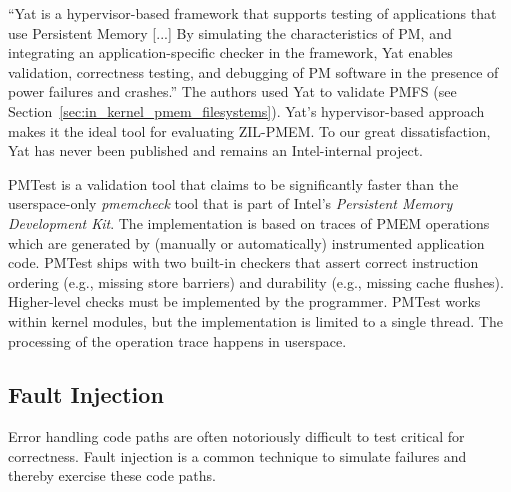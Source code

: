 \documentclass[12pt,a4paper,twoside]{book}
\begin{document}
“Yat is a hypervisor-based framework that supports testing of applications that use Persistent Memory [...]
By simulating the characteristics of PM, and integrating an application-specific checker in the framework, Yat enables validation, correctness testing, and debugging of PM software in the presence of power failures and crashes.”
The authors used Yat to validate PMFS (see Section~\ref{sec:in_kernel_pmem_filesystems}).
Yat's hypervisor-based approach makes it the ideal tool for evaluating ZIL-PMEM.
To our great dissatisfaction, Yat has never been published and remains an Intel-internal project.

PMTest is a validation tool that claims to be significantly faster than the userspace-only \textit{pmemcheck} tool that is part of Intel's \textit{Persistent Memory Development Kit}.
The implementation is based on traces of PMEM operations which are generated by (manually or automatically) instrumented application code.
PMTest ships with two built-in checkers that assert correct instruction ordering (e.g., missing store barriers) and durability (e.g., missing cache flushes).
Higher-level checks must be implemented by the programmer.
PMTest works within kernel modules, but the implementation is limited to a single thread.
The processing of the operation trace happens in userspace.

\subsection{Fault Injection}\label{sec:rel_work:fault_injection}
Error handling code paths are often notoriously difficult to test critical for correctness.
Fault injection is a common technique to simulate failures and thereby exercise these code paths.
\end{document}
